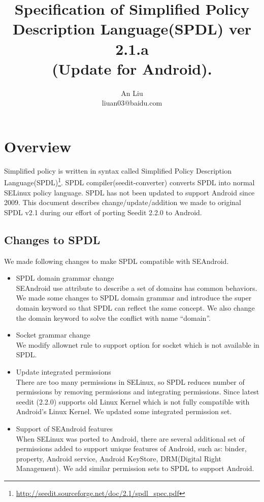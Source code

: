 \documentclass{article}
\title{Specification of Simplified Policy Description Language(SPDL) ver 2.1.a\\(Update for Android).}
\author{An Liu\\liuan03@baidu.com}
\begin{document}
\maketitle
\tableofcontents
\newpage

\section{Overview}
Simplified policy is written in  syntax  called Simplified Policy Description 
Language(SPDL)\footnote{\url{http://seedit.sourceforge.net/doc/2.1/spdl_spec.pdf}}.
 SPDL compiler(seedit-converter) converts SPDL into normal SELinux policy 
language. SPDL has not been updated to support Android since 2009. This 
document describes change/update/addition we made to original SPDL v2.1 during 
our effort of porting Seedit 2.2.0 to Android.

\subsection{Changes to SPDL}
We made following changes to make SPDL compatible with SEAndroid.
\begin{itemize}
	\item SPDL domain grammar change\\
	SEAndroid use attribute to describe a set of domains has common behaviors. 
	We made some changes to SPDL domain grammar and introduce the super domain 
	keyword so that SPDL can reflect the same concept. We also change the 
	domain keyword to solve the conflict with name ``domain''.
	\item Socket grammar change\\
	We modify allownet rule to support option for socket which is not available 
	in SPDL.
	\item Update integrated permissions\\
	There are too many permissions in SELinux, so SPDL reduces number of 
	permissions by removing permissions and integrating permissions. Since 
	latest seedit (2.2.0) supports old Linux Kernel which is not fully 
	compatible with Android's Linux Kernel. We updated some integrated 
	permission set.
	\item Support of SEAndroid features\\
	When SELinux was ported to Android, there are several additional set of 
	permissions added to support unique features of Android, such as: binder, 
	property, Android service, Android KeyStore, DRM(Digital Right Management). 
	We add similar permission sets to SPDL to support Android.
\end{itemize}
\end{document}
